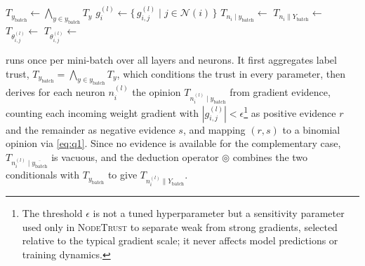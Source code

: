 \begin{algorithm}
\caption{Parameter-Trust Update: revises each parameter's trust from gradient evidence, label trust, and neuron input trust under mini-batch training (helper functions in Appendix~\ref{app:algorithm}).}
\begin{algorithmic}[1]
        \State $T_{y_\text{batch}}  \longleftarrow  \bigwedge_{y \in y_\text{batch}} T_y$ 
                \State $g^{(l)}_i  \longleftarrow  \{\, g^{(l)}_{i,j} \;|\; j \in \mathcal{N}(i)\,\}$
                \State $T_{n_i \mid y_\text{batch}}  \longleftarrow $ 
                \State $T_{n_i \parallel Y_\text{batch}}  \longleftarrow $ 
                    \State $T_{\theta_{i,j}^{(l)}}  \longleftarrow $ 
                    \State $T_{\theta_{i,j}^{(l)}} \longleftarrow $ 
                \EndFor
            \EndFor
        \EndFor
    \EndFunction
\end{algorithmic}
\label{alg:trustupdate}
\end{algorithm}
 runs once per mini-batch over all layers and neurons. It first aggregates label trust, \(T_{y_\text{batch}} = \bigwedge_{y \in y_\text{batch}} T_y\), which conditions the trust in every parameter, then derives for each neuron \(n_i^{(l)}\) the opinion \( T_{n_{i}^{(l)} \mid y_\text{batch}} \) from gradient evidence, counting each incoming weight gradient with \( |g^{(l)}_{i,j}| < \epsilon\)\footnote{The threshold $\epsilon$ is not a tuned hyperparameter but a sensitivity parameter used only in \textsc{NodeTrust} to separate weak from strong gradients, selected relative to the typical gradient scale; it never affects model predictions or training dynamics.} as positive evidence \(r\) and the remainder as negative evidence \(s\), and mapping \((r,s)\) to a binomial opinion via \cref{eq:q1}. Since no evidence is available for the complementary case, \( T_{n_{i}^{(l)} \mid \overline{y_\text{batch}}} \) is vacuous, and the deduction operator \( \circledcirc \) combines the two conditionals with \( T_{y_\text{batch}} \) to give \( T_{n_{i}^{(l)} \parallel Y_\text{batch}} \).

